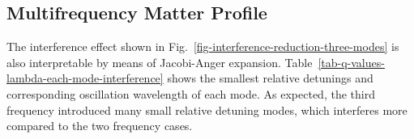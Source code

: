 \documentclass[%
reprint,
 amsmath,amssymb,
 aps,
]{revtex4-1}
\begin{document}
\subsection{Multifrequency Matter Profile}

The interference effect shown in Fig.~\ref{fig-interference-reduction-three-modes} is also interpretable by means of Jacobi-Anger expansion. Table~\ref{tab-q-values-lambda-each-mode-interference} shows the smallest relative detunings and corresponding oscillation wavelength of each mode. As expected, the third frequency introduced many small relative detuning modes, which interferes more compared to the two frequency cases.





\end{document}
